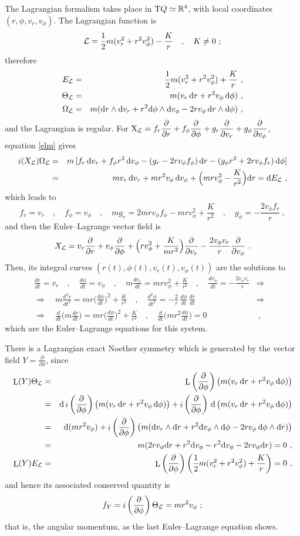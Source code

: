 \documentclass[12pt]{report}
\def\bea{\begin{eqnarray}}
\def\eea{\end{eqnarray}}
\def\beann{\begin{eqnarray*}}
\def\eeann{\end{eqnarray*}}
\def\dst{\displaystyle}
\def\derpar#1#2{\frac{\partial{#1}}{\partial{#2}}}
\def\Lag{{\cal L}}
\def\d{{\rm d}}
\def\Real{\mathbb{R}}
\def\X{{\rm X}}
\def\Tan{{\rm T}}
\def\Lie{\mathop{\rm L}\nolimits}
\def\inn{\mathop{i}\nolimits}
\begin{document}
The Lagrangian formalism takes place in $\Tan Q\simeq\Real^4$, with local coordinates 
$(r,\phi,v_r,v_\phi)$. The Lagrangian function is 
$$
\Lag=\frac{1}{2}m(v_r^2+r^2v_\phi^2)-\frac{K}{r} \quad , \quad K\not=0 \ ;
$$
therefore
\beann
E_\Lag&=&\frac{1}{2}m(v_r^2+r^2v_\phi^2)+\frac{K}{r} \ , \\
\Theta_\Lag&=&m(v_r\,\d r+r^2v_\phi\,\d\phi) \ , \\
\Omega_\Lag&=&m(\d r\wedge\d v_r+r^2\d\phi\wedge\d v_\phi-
2rv_\phi\,\d r\wedge\d \phi) \ ,
\eeann
and the Lagrangian is regular.
For $\displaystyle \X_\Lag=f_r\derpar{}{r}+f_\phi\derpar{}{\phi}+
g_r\derpar{}{v_r}+g_\phi\derpar{}{v_\phi}$, 
equation \eqref{elm} gives
\beann
\inn(X_\Lag)\Omega_\Lag&=&
m\,[f_r\, \d v_r+f_\phi r^2\, \d v_\phi-(g_r-2rv_\phi f_\phi)\, \d r-
(g_\phi r^2+2rv_\phi f_r)\, \d\phi] \\
&=& mv_r\, \d v_r+mr^2v_\phi\, \d v_\phi+\Big(mrv_\phi^2-\frac{K}{r^2}\Big)\d r=\d E_\Lag \ ,
\eeann
which leads to
$$
f_r=v_r \quad , \quad f_\phi=v_\phi \quad , \quad 
mg_r=2mrv_\phi f_\phi-mrv_\phi^2+\frac{K}{r^2} \quad , \quad 
g_\phi=-\frac{2v_\phi f_r}{r}   \ ,
$$
and then the Euler--Lagrange vector field is
$$
X_\Lag=v_r\derpar{}{r}+v_\phi\derpar{}{\phi}+\Big(rv_\phi^2+\dst\frac{K}{mr^2}\Big)\derpar{}{v_r}
-\frac{2v_\phi v_r}{r}\derpar{}{v_\phi} \ .
$$
Then, its integral curves $(r(t),\phi(t),v_r(t),v_\phi(t))$ are the solutions to
\beann
\frac{dr}{dt} =v_r \quad , \quad \frac{d\phi}{dt} =v_\phi \quad , \quad
m\frac{dv_r}{dt}=mrv_\phi^2+\frac{K}{r^2}  \quad , \quad
\frac{dv_\phi}{dt}=-\frac{2v_\phi v_r}{r} &\Longrightarrow& \\
\Longrightarrow \quad m\frac{d^2r}{dt^2}=mr\Big(\frac{d\phi}{dt}\Big)^2+\frac{K}{r^2}  
\quad , \quad  \frac{d^2\phi}{dt^2}=
-\frac{2}{r}\,\frac{d\phi}{dt}\,\frac{dr}{dt}
&\Longrightarrow& \\
\Longrightarrow \quad \frac{d}{dt}\Big(m\frac{dr}{dt}\Big)=mr\Big(\frac{d\phi}{dt}\Big)^2+\frac{K}{r^2}  
\quad , \quad \frac{d}{dt}\Big(mr^2\frac{d\phi}{dt}\Big)=0 &\ , &
\eeann
which are the Euler--Lagrange equations for this system.

There is a Lagrangian exact Noether symmetry 
which is generated by the vector field $\dst Y=\derpar{}{\phi}$, 
since
\bea
\Lie(Y)\Theta_\Lag&=& 
\Lie\left(\derpar{}{\phi}\right)\left(m(v_r\,\d r+r^2v_\phi\,\d\phi)\right) 
\nonumber \\ &=&
\d\inn\left(\derpar{}{\phi}\right)\left(m(v_r\,\d r+r^2v_\phi\,\d\phi)\right)+
\inn\left(\derpar{}{\phi}\right)\,\d\left(m(v_r\,\d r+r^2v_\phi\,\d\phi)\right) 
\nonumber\\ &=&
\d(mr^2v_\phi)+\inn\left(\derpar{}{\phi}\right)
\left(m(\d v_r\wedge\d r+r^2\d v_\phi\wedge\d\phi-
2rv_\phi\,\d \phi\wedge\d r)\right) 
\nonumber \\ &=&
m(2rv_\phi\d r+r^2\d v_\phi-r^2\d v_\phi-2rv_\phi\d r)=0 \ , 
\label{NsymKep1} \\
\Lie(Y)E_\Lag&=& 
\Lie\left(\derpar{}{\phi}\right)\left(\frac{1}{2}m(v_r^2+r^2v_\phi^2)+\frac{K}{r}\right)=0 \ ,
\label{NsymKep2}
\eea
and hence its associated conserved quantity is
$$
f_Y=\inn\left(\derpar{}{\phi}\right)\Theta_\Lag=mr^2v_\phi \ ;
$$
that is, the angular momentum, as the last Euler--Lagrange equation shows.
\end{document}

